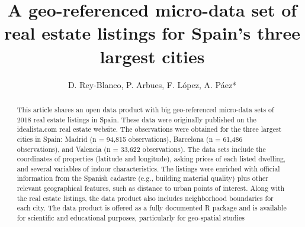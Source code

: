 \documentclass[Royal,times,]{sagej}
\begin{document}

\title{A geo-referenced micro-data set of real estate listings for
Spain's three largest cities}


\author{D. Rey-Blanco, P. Arbues, F.
López, A. Páez*}




\begin{abstract}
This article shares an open data product with big geo-referenced
micro-data sets of 2018 real estate listings in Spain. These data were
originally published on the idealista.com real estate website. The
observations were obtained for the three largest cities in Spain: Madrid
(n = 94,815 observations), Barcelona (n = 61,486 observations), and
Valencia (n = 33,622 observations). The data sets include the
coordinates of properties (latitude and longitude), asking prices of
each listed dwelling, and several variables of indoor characteristics.
The listings were enriched with official information from the Spanish
cadastre (e.g., building material quality) plus other relevant
geographical features, such as distance to urban points of interest.
Along with the real estate listings, the data product also includes
neighborhood boundaries for each city. The data product is offered as a
fully documented R package and is available for scientific and
educational purposes, particularly for geo-spatial studies
\end{abstract}


\maketitle
\end{document}
